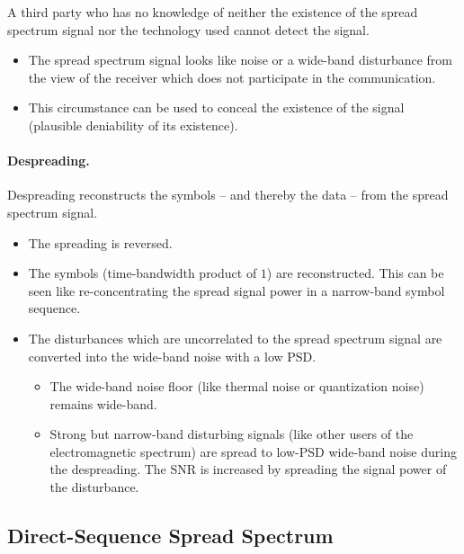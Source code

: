 \begin{refsection}
A third party who has no knowledge of neither the existence of the spread spectrum signal nor the technology used cannot detect the signal.
\begin{itemize}
	\item The spread spectrum signal looks like noise or a wide-band disturbance from the view of the receiver which does not participate in the communication.
	\item This circumstance can be used to conceal the existence of the signal (plausible deniability of its existence).
\end{itemize}

\paragraph{Despreading.}

 Despreading reconstructs the symbols -- and thereby the data -- from the spread spectrum signal.
\begin{itemize}
	\item The spreading is reversed.
	\item The symbols (time-bandwidth product of $1$) are reconstructed. This can be seen like re-concentrating the spread signal power in a narrow-band symbol sequence.
	\item The disturbances which are uncorrelated to the spread spectrum signal are converted into the wide-band noise with a low \ac{PSD}.
	\begin{itemize}
		\item The wide-band noise floor (like thermal noise or quantization noise) remains wide-band.
		\item Strong but narrow-band disturbing signals (like other users of the electromagnetic spectrum) are spread to low-\acs{PSD} wide-band noise during the despreading. The \ac{SNR} is increased by spreading the signal power of the disturbance.
	\end{itemize}
\end{itemize}

\subsection{Direct-Sequence Spread Spectrum}


\end{refsection}
